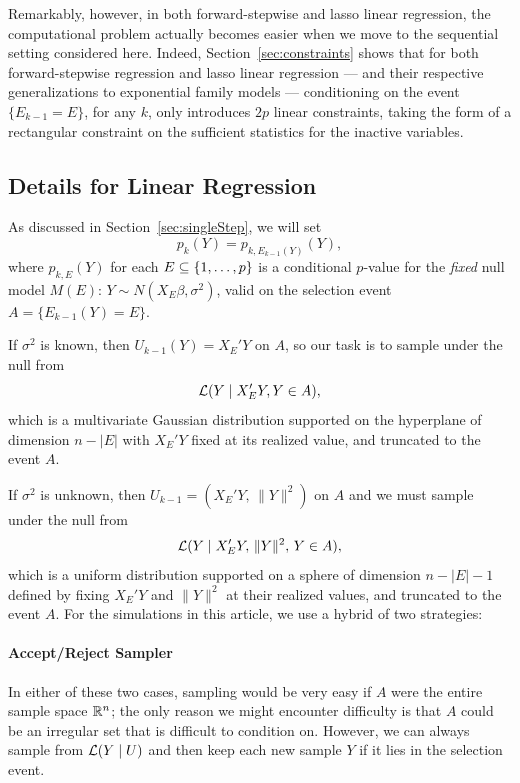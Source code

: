 \documentclass{article}
\begin{document}
Remarkably, however, in both forward-stepwise and lasso linear regression, the computational problem actually becomes easier when we move to the sequential setting considered here. Indeed, Section~\ref{sec:constraints} shows that for both forward-stepwise regression and lasso linear regression --- and their respective generalizations to exponential family models --- conditioning on the event $\{E_{k-1}=E\}$, for any $k$, only introduces $2p$ linear constraints, taking the form of a rectangular constraint on the sufficient statistics for the inactive variables.

\subsection{Details for Linear Regression}\label{sec:linRegComputation}

As discussed in Section~\ref{sec:singleStep}, we will set
\[
p_k(Y) = p_{k, E_{k-1}(Y)}(Y),
\]
where $p_{k,E}(Y)$ for each $E\subseteq \{1,\ldots, p\}$ is a conditional $p$-value for the {\em fixed} null model $M(E):\, Y \sim N(X_E\beta, \sigma^2)$, valid on the selection event $A=\{E_{k-1}(Y)=E\}$.

If $\sigma^2$ is known, then $U_{k-1}(Y) = X_{E}'Y$ on $A$, so our task is to sample under the null from
\begin{equation}\label{eq:truncNorm}
\mathcal{L}(Y \mid X_E'Y, Y\in A),
\end{equation}
which is a multivariate Gaussian distribution supported on the hyperplane of dimension $n-|E|$ with $X_E'Y$ fixed at its realized value, and truncated to the event $A$. 

If $\sigma^2$ is unknown, then $U_{k-1}=(X_E'Y,\, \|Y\|^2)$ on $A$ and we must sample under the null from
\begin{equation}\label{eq:truncUnif}
\mathcal{L}(Y \mid X_E'Y,\, \|Y\|^2,\, Y\in A),
\end{equation}
which is a uniform distribution supported on a sphere of dimension $n-|E|-1$ defined by fixing $X_E'Y$ and $\|Y\|^2$ at their realized values, and truncated to the event $A$. For the simulations in this article, we use a hybrid of two strategies:

\paragraph{Accept/Reject Sampler} In either of these two cases, sampling would be very easy if $A$ were the entire sample space $\mathbb{R}^n$; the only reason we might encounter difficulty is that $A$ could be an irregular set that is difficult to condition on. However, we can always sample from $\mathcal{L}(Y \mid U)$ and then keep each new sample $Y$ if it lies in the selection event.
\end{document}
